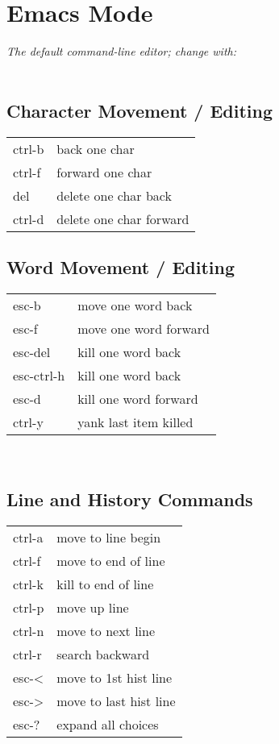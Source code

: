\section{Emacs Mode}
\textit{The default command-line editor; change with:}\\
\\


\subsection*{Character Movement / Editing}
\begin{tabular}{l  l}
    ctrl-b      & back one char \\
    ctrl-f      & forward one char \\
    del         & delete one char back \\
    ctrl-d      & delete one char forward \\
\end{tabular}


\subsection*{Word Movement / Editing}
\begin{tabular}{l  l}
    esc-b       & move one word back \\
    esc-f       & move one word forward \\
    esc-del     & kill one word back \\
    esc-ctrl-h  & kill one word back \\
    esc-d       & kill one word forward \\
    ctrl-y      & yank last item killed 
\end{tabular}
\\[7mm] %


\subsection*{Line and History Commands}
\begin{tabular}{l  l}
    ctrl-a      & move to line begin \\
    ctrl-f      & move to end of line \\
    ctrl-k      & kill to end of line \\
    ctrl-p      & move up line \\
    ctrl-n      & move to next line \\
    ctrl-r      & search backward \\
    esc-<       & move to 1st hist line \\
    esc->       & move to last hist line \\
    esc-?       & expand all choices \\ 
\end{tabular}



